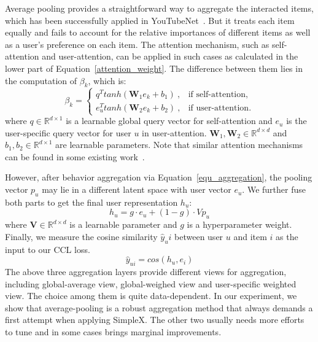 \documentclass[sigconf,authorversion]{acmart}
\begin{document}
Average pooling provides a straightforward way to aggregate the interacted items, which has been successfully applied in YouTubeNet~\cite{YouTubeNet}. But it treats each item equally and fails to account for the relative importances of different items as well as a user's preference on each item. The attention mechanism, such as self-attention and user-attention, can be applied in such cases as calculated in the lower part of Equation~\ref{attention_weight}. The difference between them lies in the computation of $\beta_k$, which is:
\begin{equation}
   \beta_k = \begin{cases}
   {q}^Ttanh(\boldsymbol{W}_1{e}_k + {b}_1)~, & \text{if self-attention}, \\[2pt]
    {e}_u^Ttanh(\boldsymbol{W}_2 {e}_k + {b}_2)~, & \text{if user-attention}.
 \end{cases}
\end{equation}
where $q\in \mathbb{R}^{d \times 1}$ is a learnable global query vector for self-attention and ${e}_u$ is the user-specific query vector for user $u$ in user-attention. ${\boldsymbol{W}_1},{\boldsymbol{W}_2} \in  \mathbb{R}^{d\times d}$ and ${b}_1,{b}_2 \in \mathbb{R}^{d\times1}$ are learnable parameters. Note that similar attention mechanisms can be found in some existing work~\cite{ACF,NPA}.






However, after behavior aggregation via Equation~\ref{equ_aggregation}, the pooling vector $p_u$ may lie in a different latent space with user vector $e_u$. We further fuse both parts to get the final user representation ${h}_u$:
\begin{equation}
{h}_u = g\cdot {e}_u + (1-g)\cdot V{p}_u
\end{equation}
where $\boldsymbol{V} \in  \mathbb{R}^{d\times d}$ is a learnable parameter and $g$ is a hyperparameter weight. Finally, we measure the cosine similarity $\hat{y}_ui$ between user $u$ and item $i$ as the input to our CCL loss.
\begin{equation}
\hat{y}_{ui} = cos(h_u, e_i)
\end{equation}
The above three aggregation layers provide different views for aggregation, including global-average view, global-weighed view and user-specific weighted view. The choice among them is quite data-dependent. In our experiment, we show that average-pooling is a robust aggregation method that always demands a first attempt when applying SimpleX. The other two usually needs more efforts to tune and in some cases brings marginal improvements. 
\end{document}
